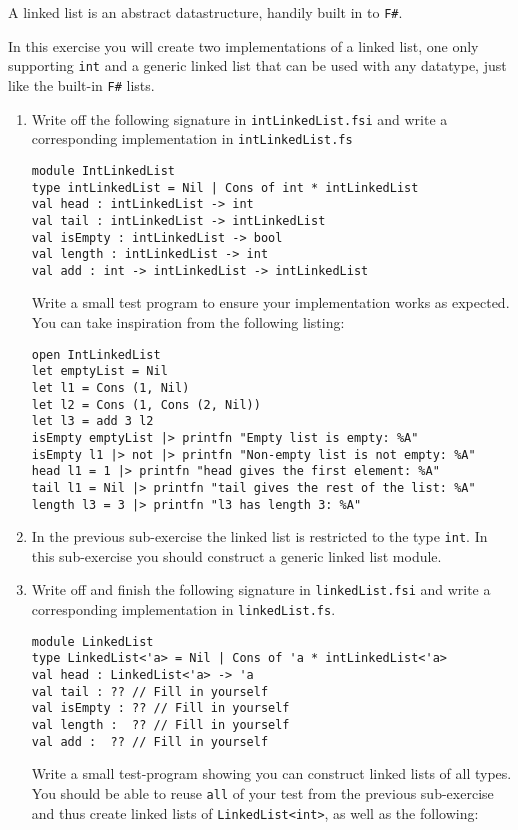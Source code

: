 A linked list is an abstract datastructure, handily built in to \texttt{F\#}.

In this exercise you will create two implementations of a linked list, one only supporting \texttt{int} and a generic linked list that can be used with any datatype, just like the built-in \texttt{F\#} lists.

\begin{enumerate}
\item Write off the following signature in \texttt{intLinkedList.fsi} and write a corresponding implementation in \texttt{intLinkedList.fs}
  \begin{lstlisting}
module IntLinkedList
type intLinkedList = Nil | Cons of int * intLinkedList
val head : intLinkedList -> int 
val tail : intLinkedList -> intLinkedList
val isEmpty : intLinkedList -> bool
val length : intLinkedList -> int
val add : int -> intLinkedList -> intLinkedList
\end{lstlisting}

Write a small test program to ensure your implementation works as expected.
You can take inspiration from the following listing:
\begin{lstlisting}
open IntLinkedList
let emptyList = Nil
let l1 = Cons (1, Nil)
let l2 = Cons (1, Cons (2, Nil))
let l3 = add 3 l2
isEmpty emptyList |> printfn "Empty list is empty: %A"
isEmpty l1 |> not |> printfn "Non-empty list is not empty: %A"
head l1 = 1 |> printfn "head gives the first element: %A"
tail l1 = Nil |> printfn "tail gives the rest of the list: %A"
length l3 = 3 |> printfn "l3 has length 3: %A"  
\end{lstlisting}

\item
  In the previous sub-exercise the linked list is restricted to the type \texttt{int}.
  In this sub-exercise you should construct a generic linked list module.
  \item Write off and finish the following signature in \texttt{linkedList.fsi} and write a corresponding implementation in \texttt{linkedList.fs}. 
    \begin{lstlisting}
module LinkedList
type LinkedList<'a> = Nil | Cons of 'a * intLinkedList<'a>
val head : LinkedList<'a> -> 'a
val tail : ?? // Fill in yourself
val isEmpty : ?? // Fill in yourself
val length :  ?? // Fill in yourself
val add :  ?? // Fill in yourself
\end{lstlisting}

Write a small test-program showing you can construct linked lists of all types.
You should be able to reuse \texttt{all} of your test from the previous sub-exercise and thus create linked lists of \lstinline{LinkedList<int>}, as well as the following:


\end{enumerate}
